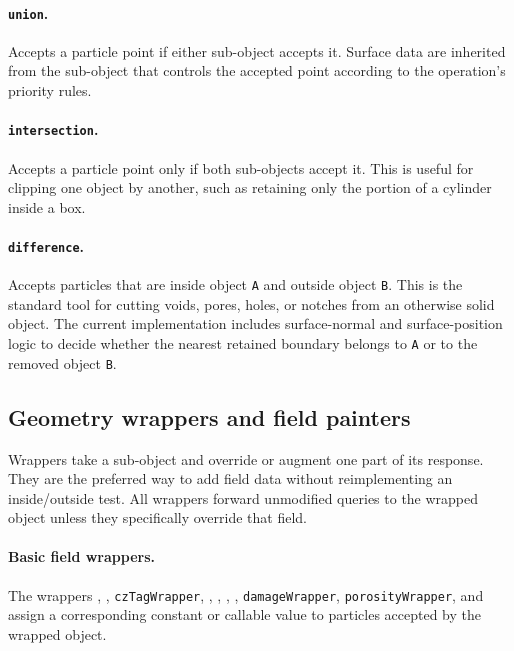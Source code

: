 \paragraph{\texttt{union}.}Accepts a particle point if either sub-object accepts it.  Surface data are inherited from the sub-object that controls the accepted point according to the operation's priority rules.

\paragraph{\texttt{intersection}.}Accepts a particle point only if both sub-objects accept it.  This is useful for clipping one object by another, such as retaining only the portion of a cylinder inside a box.

\paragraph{\texttt{difference}.}Accepts particles that are inside object \texttt{A} and outside object \texttt{B}.  This is the standard tool for cutting voids, pores, holes, or notches from an otherwise solid object.  The current implementation includes surface-normal and surface-position logic to decide whether the nearest retained boundary belongs to \texttt{A} or to the removed object \texttt{B}.

\subsection{Geometry wrappers and field painters}

Wrappers take a sub-object and override or augment one part of its response.  They are the preferred way to add field data without reimplementing an inside/outside test.  All wrappers forward unmodified queries to the wrapped object unless they specifically override that field.

\paragraph{Basic field wrappers.}The wrappers , , \texttt{czTagWrapper}, , , , , \texttt{damageWrapper}, \texttt{porosityWrapper}, and  assign a corresponding constant or callable value to particles accepted by the wrapped object.

